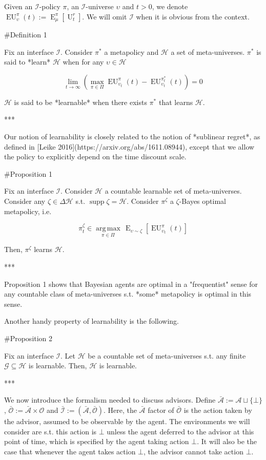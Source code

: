 \documentclass[a4paper]{article}
\DeclareMathOperator{\Supp}{supp}
\DeclareMathOperator{\E}{E}
\newcommand{\Argmax}[1]{\underset{#1}{\operatorname{arg\,max}}\,}
\newcommand{\Ob}{\mathcal{O}}
\newcommand{\A}{\mathcal{A}}
\newcommand{\I}{\mathcal{I}}
\newcommand{\Ado}{\bar{\Ob}}
\newcommand{\Ada}{\bar{\A}}
\newcommand{\Adi}{\bar{\I}}
\newcommand{\Hy}{\mathcal{H}}
\newcommand{\Ut}{\operatorname{U}}
\newcommand{\EU}{\operatorname{EU}}
\begin{document}
Given an $\I$-policy $\pi$, an $\I$-universe $\upsilon$ and $t > 0$, we denote $\EU_\upsilon^\pi(t):=\E_\mu^\pi[\Ut^r_t]$. We will omit $\I$ when it is obvious from the context.

\#Definition 1

Fix an interface $\I$. Consider $\pi^*$ a metapolicy and $\Hy$ a set of meta-universes. $\pi^*$ is said to *learn* $\Hy$ when for any $\upsilon \in \Hy$

$$\lim_{t \rightarrow \infty} (\max_{\pi \in \Pi} \EU_{\upsilon_t}^{\pi}(t) - \EU_{\upsilon_t}^{\pi^*_t}(t)) = 0$$

$\Hy$ is said to be *learnable* when there exists $\pi^*$ that learns $\Hy$.

***

Our notion of learnability is closely related to the notion of *sublinear regret*, as defined in [Leike 2016](https://arxiv.org/abs/1611.08944), except that we allow the policy to explicitly depend on the time discount scale.

\#Proposition 1

Fix an interface $\I$. Consider $\Hy$ a countable learnable set of meta-universes. Consider any $\zeta \in \Delta\Hy$ s.t. $\Supp \zeta = \Hy$. Consider $\pi^\zeta$ a $\zeta$-Bayes optimal metapolicy, i.e.

$$\pi^\zeta_t \in \Argmax{\pi \in \Pi} \E_{\upsilon \sim \zeta}[\EU_{\upsilon_t}^{\pi}(t)]$$

Then, $\pi^\zeta$ learns $\Hy$.

***

Proposition 1 shows that Bayesian agents are optimal in a "frequentist" sense for any countable class of meta-universes s.t. *some* metapolicy is optimal in this sense.

Another handy property of learnability is the following.

\#Proposition 2

Fix an interface $\I$. Let $\Hy$ be a countable set of meta-universes s.t. any finite $\mathcal{G} \subseteq \Hy$ is learnable. Then, $\Hy$ is learnable.

***

We now introduce the formalism needed to discuss advisors. Define $\Ada:=\A \sqcup \{\bot\}$, $\Ado:=\Ada \times \Ob$ and $\Adi:=(\Ada,\Ado)$. Here, the $\Ada$ factor of $\Ado$ is the action taken by the advisor, assumed to be observable by the agent. The environments we will consider are s.t. this action is $\bot$ unless the agent deferred to the advisor at this point of time, which is specified by the agent taking action $\bot$. It will also be the case that whenever the agent takes action $\bot$, the advisor cannot take action $\bot$.
\end{document}
